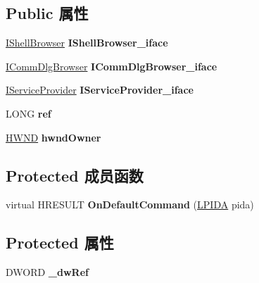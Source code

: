 \subsection*{Public 属性}
\begin{DoxyCompactItemize}
\item 
\mbox{\label{struct_i_shell_browser_impl_ab7912d53c2807d21fac8553036bcfe7e}} 
\hyperlink{interface_i_shell_browser}{I\+Shell\+Browser} {\bfseries I\+Shell\+Browser\+\_\+iface}
\item 
\mbox{\label{struct_i_shell_browser_impl_a48dcbf987b0e21ba4b1ed8327c227038}} 
\hyperlink{interface_i_comm_dlg_browser}{I\+Comm\+Dlg\+Browser} {\bfseries I\+Comm\+Dlg\+Browser\+\_\+iface}
\item 
\mbox{\label{struct_i_shell_browser_impl_a224acec0ca1a72d8cd29b83770317512}} 
\hyperlink{interface_i_service_provider}{I\+Service\+Provider} {\bfseries I\+Service\+Provider\+\_\+iface}
\item 
\mbox{\label{struct_i_shell_browser_impl_a7709ae15f357a459269547e4f7e018ad}} 
L\+O\+NG {\bfseries ref}
\item 
\mbox{\label{struct_i_shell_browser_impl_a095f36011a5448196b4d16ddce048399}} 
\hyperlink{interfacevoid}{H\+W\+ND} {\bfseries hwnd\+Owner}
\end{DoxyCompactItemize}
\subsection*{Protected 成员函数}
\begin{DoxyCompactItemize}
\item 
\mbox{\label{struct_i_shell_browser_impl_ac0320db76ed76061acae0e4a3388df6f}} 
virtual H\+R\+E\+S\+U\+LT {\bfseries On\+Default\+Command} (\hyperlink{struct_c_i_d_a}{L\+P\+I\+DA} pida)
\end{DoxyCompactItemize}
\subsection*{Protected 属性}
\begin{DoxyCompactItemize}
\item 
\mbox{\label{struct_i_shell_browser_impl_aa43253e9ce3f1b4e229b3ad3d980e4e0}} 
D\+W\+O\+RD {\bfseries \+\_\+dw\+Ref}
\end{DoxyCompactItemize}
